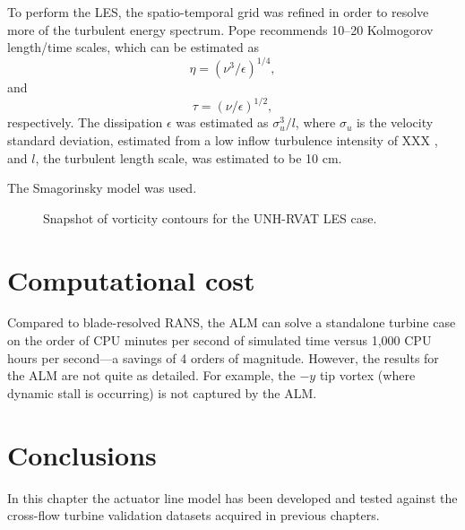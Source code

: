 To perform the LES, the spatio-temporal grid was refined in order to resolve
more of the turbulent energy spectrum. Pope \cite{Pope2000} recommends 10--20
Kolmogorov length/time scales, which can be estimated as
\begin{equation}
    \eta = ( \nu^3 / \epsilon )^{1/4},
    \label{eq:Kolmogorov-length}
\end{equation}
and
\begin{equation}
    \tau = ( \nu / \epsilon )^{1/2},
    \label{eq:Kolmogorov-time}
\end{equation}
respectively. The dissipation $\epsilon$ was estimated as $\sigma_u^3/l$, where
$\sigma_u$ is the velocity standard deviation, estimated from a low inflow
turbulence intensity of XXX , and $l$,
the turbulent length scale, was estimated to be 10 cm.

The Smagorinsky model was used.

\begin{figure}
    \caption{Snapshot of vorticity contours for the UNH-RVAT LES case.}
    
    \label{RVAT-LES}
\end{figure}




\section{Computational cost}


Compared to blade-resolved RANS, the ALM can solve a standalone turbine case on
the order of CPU minutes per second of simulated time versus 1,000 CPU hours per
second---a savings of 4 orders of magnitude. However, the results for the ALM
are not quite as detailed. For example, the $-y$ tip vortex (where dynamic stall
is occurring) is not captured by the ALM.


\section{Conclusions}

In this chapter the actuator line model has been developed and tested against
the cross-flow turbine validation datasets acquired in previous chapters.

